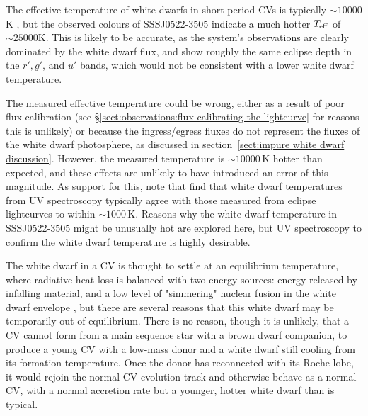 The effective temperature of white dwarfs in short period CVs is typically $\sim10000$K \citep{Pala2017a}, but the observed colours of SSSJ0522-3505 indicate a much hotter $T_{\rm eff}$ of $\sim25000$K. This is likely to be accurate, as the system's observations are clearly dominated by the white dwarf flux, and show roughly the same eclipse depth in the $r', g'$, and $u'$ bands, which would not be consistent with a lower white dwarf temperature.

The measured effective temperature could be wrong, either as a result of poor flux calibration (see \S\ref{sect:observations:flux calibrating the lightcurve} for reasons this is unlikely) or because the ingress/egress fluxes do not represent the fluxes of the white dwarf photosphere, as discussed in section~\ref{sect:impure white dwarf discussion}. However, the measured temperature is  $\sim10000$\,K hotter than expected, and these effects are unlikely to have introduced an error of this magnitude. As support for this, note that \citet{Pala2017a} find that white dwarf temperatures from UV spectroscopy typically agree with those measured from eclipse lightcurves to within $\sim1000$\,K. Reasons why the white dwarf temperature in SSSJ0522-3505 might be unusually hot are explored here, but UV spectroscopy to confirm the white dwarf temperature is highly desirable.

The white dwarf in a CV is thought to settle at an equilibrium temperature, where radiative heat loss is balanced with two energy sources: energy released by infalling material, and a low level of "simmering" nuclear fusion in the white dwarf envelope \citep{Townsley2003, Townsley2004}, but there are several reasons that this white dwarf may be temporarily out of equilibrium.
There is no reason, though it is unlikely, that a CV cannot form from a main sequence star with a brown dwarf companion, to produce a young CV with a low-mass donor and a white dwarf still cooling from its formation temperature.
Once the donor has reconnected with its Roche lobe, it would rejoin the normal CV evolution track and otherwise behave as a normal CV, with a normal accretion rate but a younger, hotter white dwarf than is typical.

